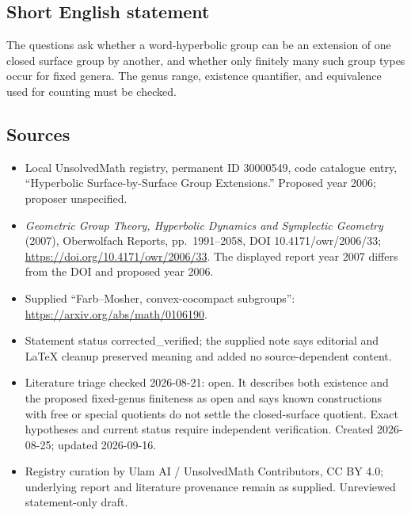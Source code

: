 \documentclass[11pt]{article}
\begin{document}
\subsection{Short English statement}
The questions ask whether a word-hyperbolic group can be an extension of one closed surface group by another, and whether only finitely many such group types occur for fixed genera. The genus range, existence quantifier, and equivalence used for counting must be checked.
\subsection{Sources}
\begin{itemize}
\item Local UnsolvedMath registry, permanent ID 30000549, code catalogue entry, ``Hyperbolic Surface-by-Surface Group Extensions.'' Proposed year 2006; proposer unspecified.
\item \emph{Geometric Group Theory, Hyperbolic Dynamics and Symplectic Geometry} (2007), Oberwolfach Reports, pp.\ 1991--2058, DOI 10.4171/owr/2006/33; \url{https://doi.org/10.4171/owr/2006/33}. The displayed report year 2007 differs from the DOI and proposed year 2006.
\item Supplied ``Farb--Mosher, convex-cocompact subgroups'': \url{https://arxiv.org/abs/math/0106190}.
\item Statement status corrected\_verified; the supplied note says editorial and LaTeX cleanup preserved meaning and added no source-dependent content.
\item Literature triage checked 2026-08-21: open. It describes both existence and the proposed fixed-genus finiteness as open and says known constructions with free or special quotients do not settle the closed-surface quotient. Exact hypotheses and current status require independent verification. Created 2026-08-25; updated 2026-09-16.
\item Registry curation by Ulam AI / UnsolvedMath Contributors, CC BY 4.0; underlying report and literature provenance remain as supplied. Unreviewed statement-only draft.
\end{itemize}
\end{document}
